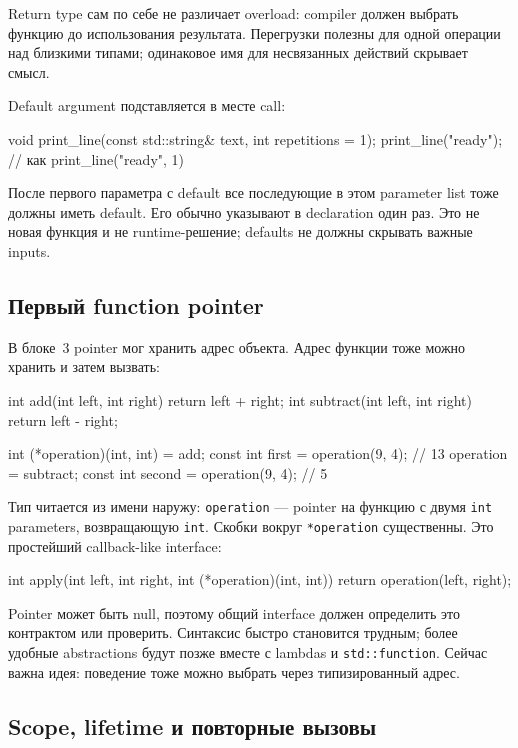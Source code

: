 Return type сам по себе не различает overload: compiler должен выбрать
функцию до использования результата. Перегрузки полезны для одной операции
над близкими типами; одинаковое имя для несвязанных действий скрывает смысл.

Default argument подставляется в месте call:

\begin{cppcode}
void print_line(const std::string& text, int repetitions = 1);
print_line("ready"); // как print_line("ready", 1)
\end{cppcode}

После первого параметра с default все последующие в этом parameter list тоже
должны иметь default. Его обычно указывают в declaration один раз. Это не
новая функция и не runtime-решение; defaults не должны скрывать важные inputs.

\subsection{Первый function pointer}

В блоке~3 pointer мог хранить адрес объекта. Адрес функции тоже можно хранить
и затем вызвать:

\begin{cppcode}
int add(int left, int right) { return left + right; }
int subtract(int left, int right) { return left - right; }

int (*operation)(int, int) = add;
const int first = operation(9, 4); // 13
operation = subtract;
const int second = operation(9, 4); // 5
\end{cppcode}

Тип читается из имени наружу: \texttt{operation} --- pointer на функцию с
двумя \texttt{int} parameters, возвращающую \texttt{int}. Скобки вокруг
\texttt{*operation} существенны. Это простейший callback-like interface:

\begin{cppcode}
int apply(int left, int right, int (*operation)(int, int)) {
    return operation(left, right);
}
\end{cppcode}

Pointer может быть null, поэтому общий interface должен определить это
контрактом или проверить. Синтаксис быстро становится трудным; более удобные
abstractions будут позже вместе с lambdas и \texttt{std::function}. Сейчас
важна идея: поведение тоже можно выбрать через типизированный адрес.

\subsection{Scope, lifetime и повторные вызовы}

